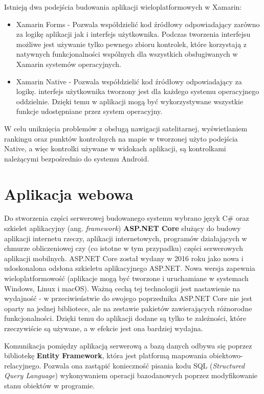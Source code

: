 Istnieją dwa podejścia budowania aplikacji wieloplatformowych w Xamarin:
\begin {itemize}
\item{Xamarin Forms} - Pozwala współdzielić kod źródłowy odpowiadający zarówno za logikę aplikacji jak i interfejs użytkownika. Podczas tworzenia interfejsu możliwe jest używanie tylko pewnego zbioru kontrolek, które korzystają z natywnych funkcjonalności wspólnych dla wszystkich obsługiwanych w Xamarin systemów operacyjnych. 
\item{Xamarin Native} - Pozwala współdzielić kod źródłowy odpowiadający za logikę. interfejs użytkownika tworzony jest dla każdego systemu operacyjnego oddzielnie. Dzięki temu w aplikacji mogą być wykorzystywane wszystkie funkcje udostępniane przez system operacyjny.
\end{itemize}
W celu uniknięcia problemów z obsługą nawigacji satelitarnej, wyświetlaniem rankingu oraz punktów kontrolnych na mapie w tworzonej użyto podejścia Native, a więc kontrolki używane w widokach aplikacji, są kontrolkami należącymi bezpośrednio do systemu Android.

\section{Aplikacja webowa}
Do stworzenia części serwerowej budowanego systemu wybrano język C\# \cite{csharp} oraz szkielet aplikacyjny (ang. \textit{framework}) \textbf{ASP.NET Core} \cite{ksiazka-asp-core} służący do budowy aplikacji internetu rzeczy, aplikacji internetowych, programów działających w chmurze obliczeniowej czy (co istotne w tym przypadku) części serwerowych aplikacji mobilnych. ASP.NET Core został wydany w 2016 roku jako nowa i udoskonalona odsłona szkieletu aplikacyjnego ASP.NET. Nowa wersja zapewnia wieloplatformowość (aplikacje mogą być tworzone i uruchamiane w systemach Windows, Linux i macOS). Ważną cechą tej technologii jest nastawienie na wydajność - w przeciwieństwie do swojego poprzednika ASP.NET Core nie jest oparty na jednej bibliotece, ale na zestawie pakietów zawierających różnorodne funkcjonalności. Dzięki temu do aplikacji dodane są tylko te zależności, które rzeczywiście są używane, a w efekcie jest ona bardziej wydajna.

Komunikacja pomiędzy aplikacją serwerową a bazą danych odbywa się poprzez bibliotekę \textbf{Entity Framework}, która jest platformą mapowania obiektowo-relacyjnego. Pozwala ona zastąpić konieczność pisania kodu SQL (\textit{Structured Query Language}) wykonywaniem operacji bazodanowych poprzez modyfikowanie stanu obiektów w programie.

